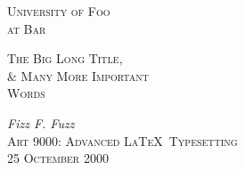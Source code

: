 \documentclass[letterpaper,titlepage,12pt]{article} %
\begin{document}
\begin{titlepage}
	\centering
	{\scshape\Large University of Foo \\ at Bar\par}
	\vspace{5cm}
	{\scshape\LARGE The Big Long Title,\\ \& Many More Important\\ Words\par}
	\vfill
	{\Large\itshape Fizz F. Fuzz\\}
	{\Large\scshape Art 9000: Advanced \LaTeX ~Typesetting\\}
	{\Large\scshape 25 Octember 2000\\}

\vspace{5cm}
\end{titlepage}

\tableofcontents
\listoffigures
\newpage




\newpage
{}
\printbibliography[heading=none]
\end{document}

